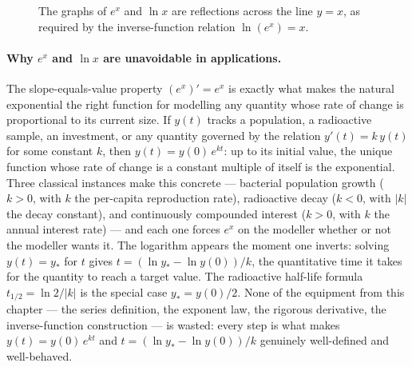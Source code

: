 \begin{figure}[H]
\centering
{}
\caption{The graphs of \(e^{x}\) and \(\ln x\) are reflections across the line \(y = x\), as required by the inverse-function relation \(\ln(e^{x}) = x\).}
\label{fig:exp-and-log-reflection}
\end{figure}

\paragraph{Why \(e^{x}\) and \(\ln x\) are unavoidable in applications.}
The slope-equals-value property \((e^{x})' = e^{x}\) is exactly what makes the natural exponential the right function for modelling any quantity whose rate of change is proportional to its current size. If \(y(t)\) tracks a population, a radioactive sample, an investment, or any quantity governed by the relation \(y'(t) = k\, y(t)\) for some constant \(k\), then \(y(t) = y(0)\, e^{kt}\): up to its initial value, the unique function whose rate of change is a constant multiple of itself is the exponential. Three classical instances make this concrete --- bacterial population growth (\(k > 0\), with \(k\) the per-capita reproduction rate), radioactive decay (\(k < 0\), with \(\lvert k \rvert\) the decay constant), and continuously compounded interest (\(k > 0\), with \(k\) the annual interest rate) --- and each one forces \(e^{x}\) on the modeller whether or not the modeller wants it. The logarithm appears the moment one inverts: solving \(y(t) = y_{\ast}\) for \(t\) gives \(t = (\ln y_{\ast} - \ln y(0))/k\), the quantitative time it takes for the quantity to reach a target value. The radioactive half-life formula \(t_{1/2} = \ln 2 / \lvert k \rvert\) is the special case \(y_{\ast} = y(0)/2\). None of the equipment from this chapter --- the series definition, the exponent law, the rigorous derivative, the inverse-function construction --- is wasted: every step is what makes \(y(t) = y(0)\, e^{kt}\) and \(t = (\ln y_{\ast} - \ln y(0))/k\) genuinely well-defined and well-behaved.

